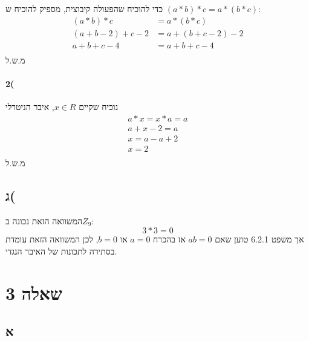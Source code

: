 \documentclass{article}
\begin{document}
כדי להוכיח שהפעולה קיבוצית, מספיק להוכיח ש $(a*b)*c = a*(b*c)$: 
\begin{align*}
  (a*b)*c &= a*(b*c)\\
  (a+b-2)+c-2 &= a+(b+c-2)-2 \\
  a+b+c-4 &= a+b+c-4 \\
\end{align*}
מ.ש.ל\\


\paragraph{2(}
נוכיח שקיים $x \in R$, איבר הניטרלי
\begin{align*}
  a*x = x*a = a\\
  a+x-2 = a\\
  x = a -a + 2\\
  x = 2\\
\end{align*}
מ.ש.ל\\


\subsection{ג(}
המשוואה הזאת נכונה ב$Z_9$:
\begin{equation*}
  3*3 = 0
\end{equation*}
אך משפט 6.2.1 טוען שאם $ab=0$ אז בהכרח $a=0$ או $b=0$, לכן המשוואה הזאת עומדת בסתירה לתכונות של האיבר הנגדי.



\section{שאלה 3}
\subsection{א}
  
\end{document}
